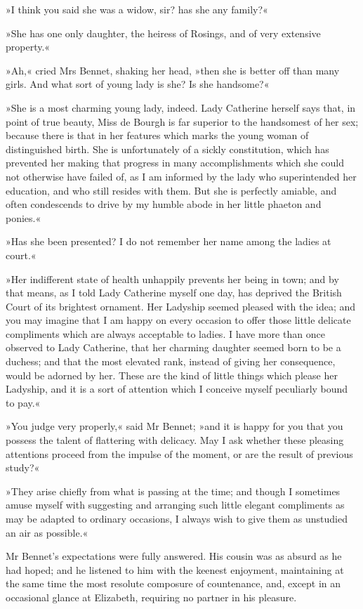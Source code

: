 »I think you said she was a widow, sir? has she any family?«

»She has one only daughter, the heiress of Rosings, and of very extensive property.«

»Ah,« cried Mrs Bennet, shaking her head, »then she is better off than many girls. And what sort of young lady is she? Is she handsome?«

»She is a most charming young lady, indeed. Lady Catherine herself says that, in point of true beauty, Miss de Bourgh is far superior to the handsomest of her sex; because there is that in her features which marks the young woman of distinguished birth. She is unfortunately of a sickly constitution, which has prevented her making that progress in many accomplishments which she could not otherwise have failed of, as I am informed by the lady who superintended her education, and who still resides with them. But she is perfectly amiable, and often condescends to drive by my humble abode in her little phaeton and ponies.«

»Has she been presented? I do not remember her name among the ladies at court.«

»Her indifferent state of health unhappily prevents her being in town; and by that means, as I told Lady Catherine myself one day, has deprived the British Court of its brightest ornament. Her Ladyship seemed pleased with the idea; and you may imagine that I am happy on every occasion to offer those little delicate compliments which are always acceptable to ladies. I have more than once observed to Lady Catherine, that her charming daughter seemed born to be a duchess; and that the most elevated rank, instead of giving her consequence, would be adorned by her. These are the kind of little things which please her Ladyship, and it is a sort of attention which I conceive myself peculiarly bound to pay.«

»You judge very properly,« said Mr Bennet; »and it is happy for you that you possess the talent of flattering with delicacy. May I ask whether these pleasing attentions proceed from the impulse of the moment, or are the result of previous study?«

»They arise chiefly from what is passing at the time; and though I sometimes amuse myself with suggesting and arranging such little elegant compliments as may be adapted to ordinary occasions, I always wish to give them as unstudied an air as possible.«

Mr Bennet's expectations were fully answered. His cousin was as absurd as he had hoped; and he listened to him with the keenest enjoyment, maintaining at the same time the most resolute composure of countenance, and, except in an occasional glance at Elizabeth, requiring no partner in his pleasure.

